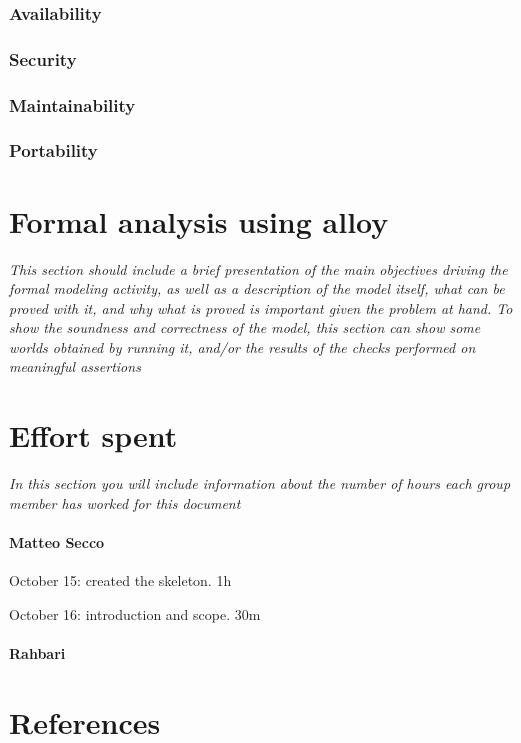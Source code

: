\documentclass{article}
\begin{document}
		\subsubsection{Availability}
		\subsubsection{Security}
		\subsubsection{Maintainability}
		\subsubsection{Portability}
\section{Formal analysis using alloy} \textit{This section should include a brief presentation of the main objectives driving the formal modeling activity, as well as a description of the model itself, what can be proved with it, and why what is proved is important given the problem at hand. To show the soundness and correctness of the model, this section can show some worlds obtained by running it, and/or the results of the checks performed on meaningful assertions}
\section{Effort spent} \textit{In this section you will include information about the number of hours each group member has worked for this document}
	\paragraph{Matteo Secco} 
		\begin{list}{-}{}
			\item October 15: created the skeleton. 1h
			\item October 16: introduction and scope. 30m
		\end{list}
	\paragraph{Rahbari}
\section{References}
\end{document}
